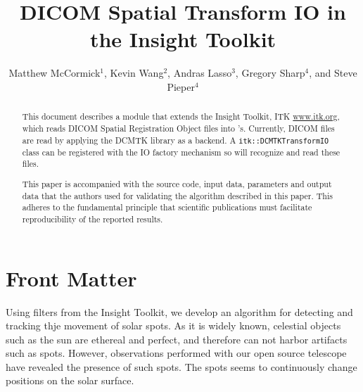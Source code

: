 \documentclass{InsightArticle}
\title{DICOM Spatial Transform IO in the Insight Toolkit}
\author{Matthew McCormick$^{1}$,
        Kevin Wang$^{2}$,
        Andras Lasso$^{3}$,
        Gregory Sharp$^{4}$,
        and Steve Pieper$^{4}$}
\newcommand{\IJhandlerIDnumber}{1338}
\begin{document}
%
%
\IJhandlefooter{\IJhandlerIDnumber}


\ifpdf
\else
\fi


\maketitle


\ifhtml
\chapter*{Front Matter\label{front}}
\fi


\begin{abstract}
\noindent
This document describes a module that extends the Insight Toolkit,
ITK \url{www.itk.org}, which reads DICOM Spatial Registration Object files into
's. Currently, DICOM files are read by applying the DCMTK
library as a backend. A \texttt{itk::DCMTKTransformIO} class can be registered
with the IO factory mechanism so  will recognize
and read these files.

This paper is accompanied with the source code, input data, parameters and
output data that the authors used for validating the algorithm described in
this paper. This adheres to the fundamental principle that scientific
publications must facilitate reproducibility of the reported results.

\end{abstract}

\IJhandlenote{\IJhandlerIDnumber}

\tableofcontents

Using filters from the Insight Toolkit, we develop an algorithm for detecting
and tracking thje movement of solar spots. As it is widely known, celestial
objects such as the sun are ethereal and perfect, and therefore can not harbor
artifacts such as spots. However, observations performed with our open source
telescope have revealed the presence of such spots. The spots seems to continuously change positions on the solar surface.
\end{document}
